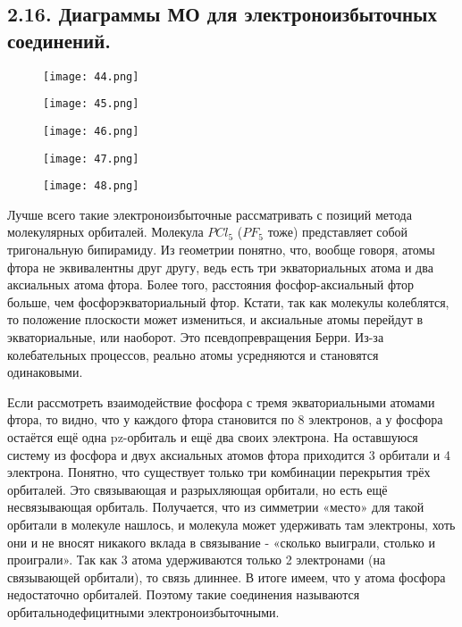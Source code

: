 
	\subsection{2.16. Диаграммы МО для электроноизбыточных соединений.} 
	
	\par\bigskip
	
	\begin{figure}[H]
		\centering
		{\texttt{[image: 44.png]}}
	\end{figure}
	
	\begin{figure}[h]
		\centering
		{\texttt{[image: 45.png]}}
	\end{figure}
	
		\begin{figure}[H]
		\centering
		{\texttt{[image: 46.png]}}
	\end{figure}

	\begin{figure}[H]
	\centering
	{\texttt{[image: 47.png]}}
\end{figure}

	\begin{figure}[H]
	\centering
	{\texttt{[image: 48.png]}}
\end{figure}
	
	
	Лучше всего такие электроноизбыточные рассматривать с позиций метода молекулярных орбиталей. Молекула $PCl_5$ ($PF_5$ тоже) представляет собой тригональную бипирамиду. Из геометрии понятно, что,
	вообще говоря, атомы фтора не эквивалентны друг другу, ведь есть три экваториальных атома и два аксиальных атома фтора. Более того, расстояния фосфор-аксиальный фтор больше, чем фосфорэкваториальный фтор. Кстати, так как молекулы колеблятся, то положение плоскости может измениться, и аксиальные атомы перейдут в экваториальные, или наоборот. Это псевдопревращения Берри. Из-за
	колебательных процессов, реально атомы усредняются и становятся одинаковыми.
	
	\par\smallskip
	
	Если рассмотреть взаимодействие фосфора с тремя экваториальными атомами фтора, то видно, что у каждого фтора становится по 8 электронов, а у фосфора остаётся ещё одна pz-орбиталь и ещё два своих
	электрона. На оставшуюся систему из фосфора и двух аксиальных атомов фтора приходится 3 орбитали и 4 электрона. Понятно, что существует только три комбинации перекрытия трёх орбиталей. Это
	связывающая и разрыхляющая орбитали, но есть ещё несвязывающая орбиталь. Получается, что из симметрии «место» для такой орбитали в молекуле нашлось, и молекула может удерживать там электроны,
	хоть они и не вносят никакого вклада в связывание - «сколько выиграли, столько и проиграли». Так как 3 атома удерживаются только 2 электронами (на связывающей орбитали), то связь длиннее. В итоге
	имеем, что у атома фосфора недостаточно орбиталей. Поэтому такие соединения называются орбитальнодефицитными электроноизбыточными.
	
